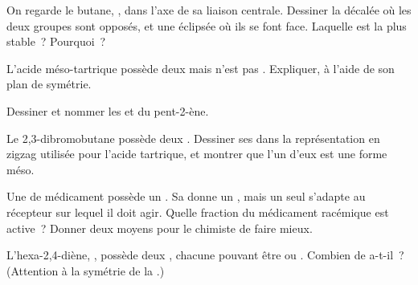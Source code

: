 \begin{exercise}[$\star\star$]\label{exo:g12:stereochemistry:9}
On regarde le butane, , dans l'axe de sa liaison
centrale. Dessiner la  décalée où les deux groupes
 sont opposés, et une  éclipsée où ils se font face.
Laquelle est la plus stable~? Pourquoi~?
\end{exercise}

\begin{exercise}[$\star\star$]\label{exo:g12:stereochemistry:10}
L'acide méso-tartrique possède deux  mais n'est pas
. Expliquer, à l'aide de son plan de symétrie.
\end{exercise}

\begin{exercise}[$\star\star$]\label{exo:g12:stereochemistry:11}
Dessiner et nommer les  et  du pent-2-ène.
\end{exercise}

\begin{exercise}[$\star\star\star$]\label{exo:g12:stereochemistry:12}
Le 2,3-dibromobutane  possède deux . Dessiner ses  dans la représentation en
zigzag utilisée pour l'acide tartrique, et montrer que l'un d'eux est
une forme méso.
\end{exercise}

\begin{exercise}[$\star\star\star$]\label{exo:g12:stereochemistry:13}
Une  de médicament possède un . Sa 
donne un , mais un seul  s'adapte au
récepteur  sur lequel il doit agir. Quelle fraction du médicament
racémique est active~? Donner deux moyens pour le chimiste de faire
mieux.
\end{exercise}

\begin{exercise}[$\star\star\star$]\label{exo:g12:stereochemistry:14}
L'hexa-2,4-diène, , possède deux , chacune pouvant être  ou . Combien de  a-t-il~?
(Attention à la symétrie de la .)
\end{exercise}


